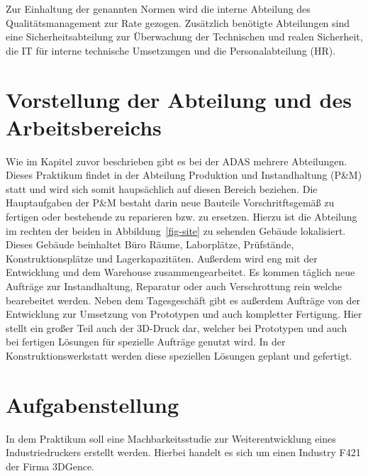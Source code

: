 \documentclass[
  ngerman,
  titlepage=true,
  listof=totoc]{scrartcl}
\begin{document}
Zur Einhaltung der genannten Normen wird die interne Abteilung des
Qualitätsmanagement zur Rate gezogen. Zusätzlich benötigte Abteilungen
sind eine Sicherheitsabteilung zur Überwachung der Technischen und
realen Sicherheit, die IT für interne technische Umsetzungen und die
Personalabteilung (HR).

\section{Vorstellung der Abteilung und des
Arbeitsbereichs}\label{vorstellung-der-abteilung-und-des-arbeitsbereichs}

Wie im Kapitel zuvor beschrieben gibt es bei der ADAS mehrere
Abteilungen. Dieses Praktikum findet in der Abteilung Produktion und
Instandhaltung (P\&M) statt und wird sich somit haupsächlich auf diesen
Bereich beziehen. Die Hauptaufgaben der P\&M bestaht darin neue Bauteile
Vorschritftsgemäß zu fertigen oder bestehende zu reparieren bzw. zu
ersetzen. Hierzu ist die Abteilung im rechten der beiden in
Abbildung~\ref{fig-site} zu sehenden Gebäude lokalisiert. Dieses Gebäude
beinhaltet Büro Räume, Laborplätze, Prüfstände, Konstruktionsplätze und
Lagerkapazitäten. Außerdem wird eng mit der Entwicklung und dem
Warehouse zusammengearbeitet. Es kommen täglich neue Aufträge zur
Instandhaltung, Reparatur oder auch Verschrottung rein welche
bearebeitet werden. Neben dem Tagesgeschäft gibt es außerdem Aufträge
von der Entwicklung zur Umsetzung von Prototypen und auch kompletter
Fertigung. Hier stellt ein großer Teil auch der 3D-Druck dar, welcher
bei Prototypen und auch bei fertigen Lösungen für spezielle Aufträge
genutzt wird. In der Konstruktionswerkstatt werden diese speziellen
Lösungen geplant und gefertigt.

\newpage

\section{Aufgabenstellung}\label{aufgabenstellung}

In dem Praktikum soll eine Machbarkeitsstudie zur Weiterentwicklung
eines Industriedruckers erstellt werden. Hierbei handelt es sich um
einen Industry F421 der Firma 3DGence.
\end{document}
